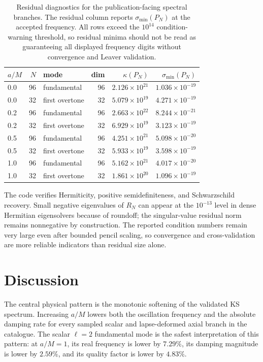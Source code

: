 \documentclass[10pt,letterpaper,twocolumn]{article}
\begin{document}
\begin{table}[t]
\centering
\footnotesize
\renewcommand{\arraystretch}{1.14}
\begin{tabular}{lrlrrr}
\toprule
\(a/M\) & \(N\) & mode & dim & \(\kappa(P_N)\) & \(\sigma_{\min}(P_N)\)\\
\midrule
0.0 & 96 & fundamental & 96 & \(2.126\times10^{21}\) & \(1.036\times10^{-19}\)\\
0.0 & 32 & first overtone & 32 & \(5.079\times10^{19}\) & \(4.271\times10^{-19}\)\\
0.2 & 96 & fundamental & 96 & \(2.663\times10^{22}\) & \(8.244\times10^{-21}\)\\
0.2 & 32 & first overtone & 32 & \(6.929\times10^{19}\) & \(3.123\times10^{-19}\)\\
0.5 & 96 & fundamental & 96 & \(4.251\times10^{21}\) & \(5.098\times10^{-20}\)\\
0.5 & 32 & first overtone & 32 & \(5.933\times10^{19}\) & \(3.598\times10^{-19}\)\\
1.0 & 96 & fundamental & 96 & \(5.162\times10^{21}\) & \(4.017\times10^{-20}\)\\
1.0 & 32 & first overtone & 32 & \(1.861\times10^{20}\) & \(1.096\times10^{-19}\)\\
\bottomrule
\end{tabular}
\caption{Residual diagnostics for the publication-facing spectral branches. The residual column reports \(\sigma_{\min}(P_N)\) at the accepted frequency. All rows exceed the \(10^{14}\) condition-warning threshold, so residual minima should not be read as guaranteeing all displayed frequency digits without convergence and Leaver validation.}
\label{tab:residualdiagnostics}
\end{table}

The code verifies Hermiticity, positive semidefiniteness, and Schwarzschild recovery. Small negative eigenvalues of \(R_N\) can appear at the \(10^{-13}\) level in dense Hermitian eigensolvers because of roundoff; the singular-value residual norm remains nonnegative by construction. The reported condition numbers remain very large even after bounded pencil scaling, so convergence and cross-validation are more reliable indicators than residual size alone.

\section{Discussion}

The central physical pattern is the monotonic softening of the validated KS spectrum. Increasing \(a/M\) lowers both the oscillation frequency and the absolute damping rate for every sampled scalar and lapse-deformed axial branch in the catalogue. The scalar \(\ell=2\) fundamental mode is the safest interpretation of this pattern: at \(a/M=1\), its real frequency is lower by \(7.29\%\), its damping magnitude is lower by \(2.59\%\), and its quality factor is lower by \(4.83\%\).
\end{document}
